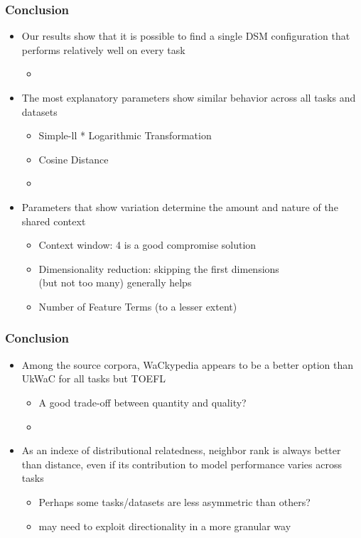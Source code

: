 \documentclass[t]{beamer} %
\begin{document}
\begin{frame}
  \frametitle{Conclusion}

  \begin{itemize}
  \item Our results show that it is possible to find a single DSM configuration that performs relatively well on every task
    \begin{itemize}
    \item[]
    \end{itemize}
  \item The most explanatory parameters show similar behavior across all tasks and datasets
    \begin{itemize}
    \item Simple-ll * Logarithmic Transformation 
    \item Cosine Distance
    \item[]
    \end{itemize}
  \item Parameters that show variation determine the amount and nature of the shared context
    \begin{itemize}
    \item Context window: 4 is a good compromise solution
    \item Dimensionality reduction: skipping the first dimensions\\ (but not too many) generally helps 
    \item Number of Feature Terms (to a lesser extent)
    \end{itemize}
  \end{itemize}
\end{frame}


\begin{frame}
  \frametitle{Conclusion}
  
  \begin{itemize}
  \item Among the source corpora, WaCkypedia appears to be a better option than UkWaC for all tasks but TOEFL
    \begin{itemize}
    \item A good trade-off between quantity and quality?
    \item[]
    \end{itemize}
  \item As an indexe of distributional relatedness, neighbor rank is always better than distance, even if its contribution to model performance varies across tasks
    \begin{itemize}
    \item Perhaps some tasks/datasets are less asymmetric than others? 
    \item may need to exploit directionality in a more granular way
    \end{itemize}
  \end{itemize}
\end{frame}



\end{document}
